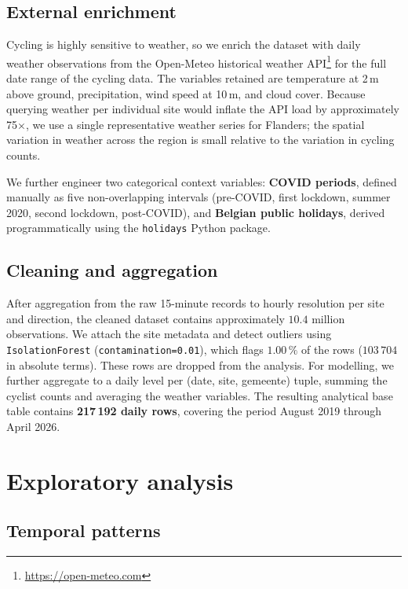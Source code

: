 \documentclass[11pt,a4paper]{article}
\begin{document}
\subsection{External enrichment}

Cycling is highly sensitive to weather, so we enrich the dataset with
daily weather observations from the Open-Meteo
historical weather API\footnote{\url{https://open-meteo.com}} for the
full date range of the cycling data. The variables retained are
temperature at 2\,m above ground, precipitation, wind speed at 10\,m,
and cloud cover. Because querying weather per individual site would
inflate the API load by approximately 75$\times$, we use a single
representative weather series for Flanders; the spatial variation in
weather across the region is small relative to the variation in cycling
counts.

We further engineer two categorical context variables:
\textbf{COVID periods}, defined manually as five non-overlapping
intervals (pre-COVID, first lockdown, summer 2020, second lockdown,
post-COVID), and \textbf{Belgian public holidays}, derived
programmatically using the \texttt{holidays} Python package.

\subsection{Cleaning and aggregation}

After aggregation from the raw 15-minute records to hourly resolution
per site and direction, the cleaned dataset contains approximately
$10.4$ million observations. We attach the site metadata and detect
outliers using \texttt{IsolationForest} (\texttt{contamination=0.01}),
which flags $1.00\,\%$ of the rows ($103\,704$ in absolute terms).
These rows are dropped from the analysis. For modelling, we further
aggregate to a daily level per (date, site, gemeente) tuple, summing
the cyclist counts and averaging the weather variables. The resulting
analytical base table contains \textbf{217\,192 daily rows}, covering
the period August 2019 through April 2026.

\section{Exploratory analysis}
\label{sec:eda}

\subsection{Temporal patterns}
\end{document}
